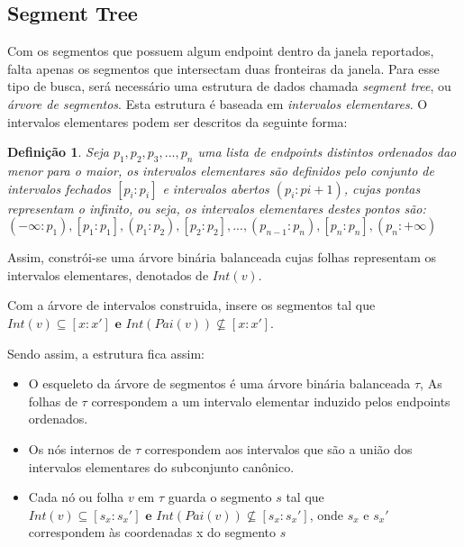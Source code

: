 \documentclass{article}
\newtheorem{definicao}{Definição}
\theoremstyle{definition}
\begin{document}
\subsection{Segment Tree}
\hspace*{15pt} Com os segmentos que possuem algum endpoint dentro da janela reportados,
falta apenas os segmentos que intersectam duas fronteiras da janela. Para esse tipo
de busca, será necessário uma estrutura de dados chamada \textit{segment tree}, ou
\textit{árvore de segmentos}. Esta estrutura é baseada em \textit{intervalos elementares}.
O intervalos elementares podem ser descritos da seguinte forma:
\begin{definicao}
    Seja $p_1, p_2, p_3, ..., p_n$ uma lista de endpoints distintos ordenados dao menor
    para o maior, os intervalos elementares são definidos pelo conjunto de intervalos
    fechados $[p_i:p_i]$ e intervalos abertos $(p_i:p{i+1})$, cujas pontas representam
    o infinito, ou seja, os intervalos elementares destes pontos são:
    $(-\infty: p_1), [p_1:p_1], (p_1:p_2), [p_2:p_2], ..., (p_{n-1}:p_n), [p_n:p_n], (p_n:+\infty)$
\end{definicao}
\hspace*{15pt} Assim, constrói-se uma árvore binária balanceada cujas folhas representam
os intervalos elementares, denotados de $Int(v)$. 

\hspace*{15pt} Com a árvore de intervalos construida, insere os segmentos tal que\\
\mbox{$Int(v) \subseteq [x:x'] \textbf{ e } Int(Pai(v)) \not\subseteq [x:x']$}.

\hspace*{15pt} Sendo assim, a estrutura fica assim:
\begin{itemize}
    \item O esqueleto da árvore de segmentos é uma árvore binária balanceada $\tau$,
        As folhas de $\tau$ correspondem a um intervalo elementar induzido pelos
        endpoints ordenados.
    \item Os nós internos de $\tau$ correspondem aos intervalos que são a união dos
        intervalos elementares do subconjunto canônico.
    \item Cada nó ou folha $v$ em $\tau$ guarda o segmento $s$ tal que \\
        \mbox{$Int(v) \subseteq [s_x:s_x'] \textbf{ e } Int(Pai(v)) \not\subseteq [s_x:s_x']$},
        onde $s_x$ e $s_x'$ correspondem às coordenadas x do segmento $s$
\end{itemize}
\end{document}
